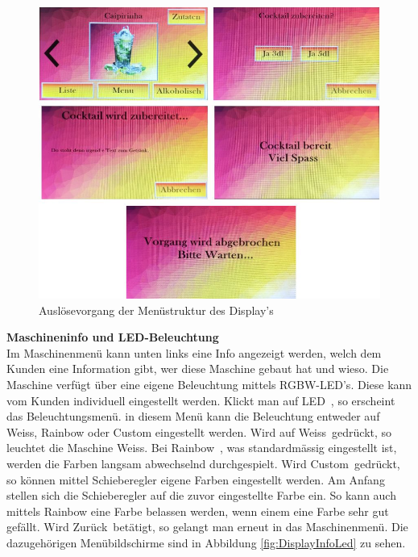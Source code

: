 \begin{figure}[H]
	\centering
	\includegraphics[width=\textwidth]{graphics/DisplayAusloesen}
	\caption{Auslösevorgang der Menüstruktur des Display's \cite{pngimgcom_cocktail_nodate-6}}
	\label{fig:DisplayAusloesen}
\end{figure}

\textbf{Maschineninfo und LED-Beleuchtung}\\
Im Maschinenmenü kann unten links eine Info angezeigt werden, welch dem Kunden eine Information gibt, wer diese Maschine gebaut hat und wieso. Die Maschine verfügt über eine eigene Beleuchtung mittels RGBW-LED's. Diese kann vom Kunden individuell eingestellt werden. Klickt man auf \flqq LED\frqq~, so erscheint das Beleuchtungsmenü. in diesem Menü kann die Beleuchtung entweder auf Weiss, Rainbow oder Custom eingestellt werden. Wird auf \flqq Weiss\frqq~gedrückt, so leuchtet die Maschine Weiss. Bei \flqq Rainbow\frqq~, was standardmässig eingestellt ist, werden die Farben langsam abwechselnd durchgespielt. Wird \flqq Custom\frqq~gedrückt, so können mittel Schieberegler eigene Farben eingestellt werden. Am Anfang stellen sich die Schieberegler auf die zuvor eingestellte Farbe ein. So kann auch mittels Rainbow eine Farbe belassen werden, wenn einem eine Farbe sehr gut gefällt. Wird \flqq Zurück\frqq~betätigt, so gelangt man erneut in das Maschinenmenü. Die dazugehörigen Menübildschirme sind in Abbildung \ref{fig:DisplayInfoLed} zu sehen.

